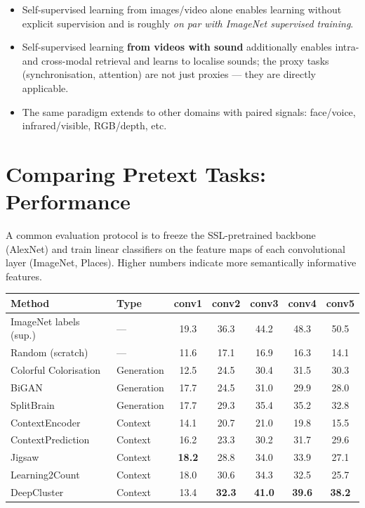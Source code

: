 \documentclass[11pt,a4paper]{article}
\theoremstyle{definition}
\theoremstyle{plain}
\theoremstyle{remark}
\begin{document}
\begin{itemize}
    \item Self-supervised learning from images/video alone enables learning without explicit supervision and is roughly \emph{on par with ImageNet supervised training}.
    \item Self-supervised learning \textbf{from videos with sound} additionally enables intra- and cross-modal retrieval and learns to localise sounds; the proxy tasks (synchronisation, attention) are not just proxies --- they are directly applicable.
    \item The same paradigm extends to other domains with paired signals: face/voice, infrared/visible, RGB/depth, etc.
\end{itemize}


\section{Comparing Pretext Tasks: Performance}

A common evaluation protocol is to freeze the SSL-pretrained backbone (AlexNet) and train linear classifiers on the feature maps of each convolutional layer (ImageNet, Places). Higher numbers indicate more semantically informative features.

\begin{tcolorbox}[colback=gray!5!white,colframe=gray!60!black,title=\textbf{Linear Classification on AlexNet Feature Maps}]
\begin{center}
\small
\begin{tabular}{|l|l|c|c|c|c|c|}
\hline
Method & Type & conv1 & conv2 & conv3 & conv4 & conv5 \\
\hline
ImageNet labels (sup.) & --- & 19.3 & 36.3 & 44.2 & 48.3 & 50.5 \\
Random (scratch) & --- & 11.6 & 17.1 & 16.9 & 16.3 & 14.1 \\
\hline
Colorful Colorisation & Generation & 12.5 & 24.5 & 30.4 & 31.5 & 30.3 \\
BiGAN & Generation & 17.7 & 24.5 & 31.0 & 29.9 & 28.0 \\
SplitBrain & Generation & 17.7 & 29.3 & 35.4 & 35.2 & 32.8 \\
\hline
ContextEncoder & Context & 14.1 & 20.7 & 21.0 & 19.8 & 15.5 \\
ContextPrediction & Context & 16.2 & 23.3 & 30.2 & 31.7 & 29.6 \\
Jigsaw & Context & \textbf{18.2} & 28.8 & 34.0 & 33.9 & 27.1 \\
Learning2Count & Context & 18.0 & 30.6 & 34.3 & 32.5 & 25.7 \\
DeepCluster & Context & 13.4 & \textbf{32.3} & \textbf{41.0} & \textbf{39.6} & \textbf{38.2} \\
\hline
\end{tabular}
\end{center}
\end{tcolorbox}
\end{document}
